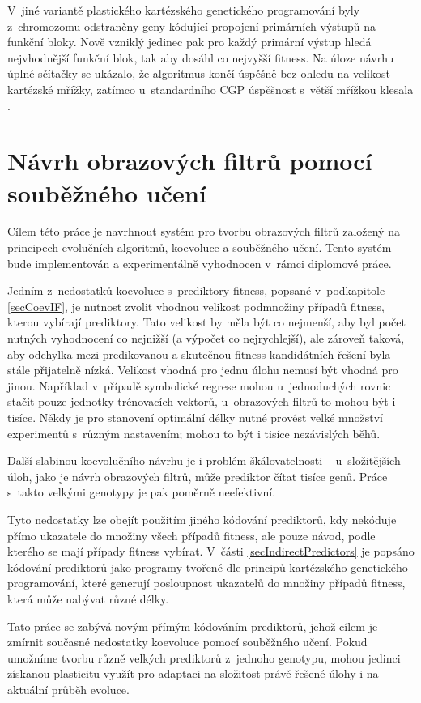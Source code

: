 V~jiné variantě plastického kartézského genetického programování byly z~chromozomu odstraněny geny kódující  propojení primárních výstupů na funkční bloky. Nově vzniklý jedinec pak pro každý primární výstup hledá nejvhodnější funkční blok, tak aby dosáhl co nejvyšší fitness. Na úloze návrhu úplné sčítačky se ukázalo, že algoritmus končí úspěšně bez ohledu na velikost kartézské mřížky, zatímco u~standardního CGP úspěšnost s~větší mřížkou klesala \cite{KhatirPlasticCGP}.

\chapter{Návrh obrazových filtrů pomocí souběžného učení}
\label{chDesign}

Cílem této práce je navrhnout systém pro tvorbu obrazových filtrů založený na principech evolučních algoritmů, koevoluce a souběžného učení. Tento systém bude implementován a experimentálně vyhodnocen v~rámci diplomové práce.

Jedním z~nedostatků koevoluce s~prediktory fitness, popsané v~podkapitole \ref{secCoevIF}, je nutnost zvolit vhodnou velikost podmnožiny případů fitness, kterou vybírají prediktory. Tato velikost by měla být co nejmenší, aby byl počet nutných vyhodnocení co nejnižší (a výpočet co nejrychlejší), ale zároveň taková, aby odchylka mezi predikovanou a skutečnou fitness kandidátních řešení byla stále přijatelně nízká. Velikost vhodná pro jednu úlohu nemusí být vhodná pro jinou. Například v~případě symbolické regrese mohou u~jednoduchých rovnic stačit pouze jednotky trénovacích vektorů, u~obrazových filtrů to mohou být i tisíce. Někdy je pro stanovení optimální délky nutné provést velké množství experimentů s~různým nastavením; mohou to být i tisíce nezávislých běhů.

Další slabinou koevolučního návrhu je i problém škálovatelnosti -- u~složitějších úloh, jako je návrh obrazových filtrů, může prediktor čítat tisíce genů. Práce s~takto velkými genotypy je pak poměrně neefektivní.

Tyto nedostatky lze obejít použitím jiného kódování prediktorů, kdy nekóduje přímo ukazatele do množiny všech případů fitness, ale pouze návod, podle kterého se mají případy fitness vybírat. V~části \ref{secIndirectPredictors} je popsáno kódování prediktorů jako programy tvořené dle principů kartézského genetického programování, které generují posloupnost ukazatelů do množiny případů fitness, která může nabývat různé délky.

Tato práce se zabývá novým přímým kódováním prediktorů, jehož cílem je zmírnit současné nedostatky koevoluce pomocí souběžného učení. Pokud umožníme tvorbu různě velkých prediktorů z~jednoho genotypu, mohou jedinci získanou plasticitu využít pro adaptaci na složitost právě řešené úlohy i na aktuální průběh evoluce.

